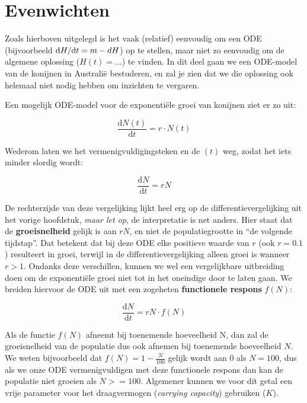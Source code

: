 \documentclass[
  a4paper,
]{scrbook}
\theoremstyle{definition}
\theoremstyle{remark}
\begin{document}
\section{Evenwichten}\label{evenwichten}

Zoals hierboven uitgelegd is het vaak (relatief) eenvoudig om een ODE
(bijvoorbeeld \(\mathchoice{\frac{\mathrm{d}H}
{\mathrm{d}t}}{\mathrm{d}H/\mathrm{d}t}
{\mathrm{d}H/\mathrm{d}t}
{\mathrm{d}H/\mathrm{d}t} = m - dH\)) op te stellen, maar niet zo
eenvoudig om de algemene oplossing (\(H(t) = ...\)) te vinden. In dit
deel gaan we een ODE-model van de konijnen in Australië bestuderen, en
zal je zien dat we die oplossing ook helemaal niet nodig hebben om
inzichten te vergaren.

Een mogelijk ODE-model voor de exponentiële groei van konijnen ziet er
zo uit:

\begin{equation}
    \frac{\mathrm{d}N(t)}{\mathrm{d}t} = r \cdot N(t)
\end{equation}

Wederom laten we het vermenigvuldigingsteken en de \((t)\) weg, zodat
het iets minder slordig wordt:

\begin{equation}
    \frac{\mathrm{d}N}{\mathrm{d}t} = rN
\end{equation}

De rechterzijde van deze vergelijking lijkt heel erg op de
differentievergelijking uit het vorige hoofdstuk, \emph{maar let op}, de
interpretatie is net anders. Hier staat dat de \textbf{groeisnelheid}
gelijk is aan \(rN\), en niet de populatiegrootte in ``de volgende
tijdstap''. Dat betekent dat bij deze ODE elke positieve waarde van
\(r\) (ook \(r=0.1\)) resulteert in groei, terwijl in de
differentievergelijking alleen groei is wanneer \(r>1\). Ondanks deze
verschillen, kunnen we wel een vergelijkbare uitbreiding doen om de
exponentiële groei niet tot in het oneindige door te laten gaan. We
breiden hiervoor de ODE uit met een zogeheten \textbf{functionele
respons} \(f(N)\):

\begin{equation}
    \frac{\mathrm{d}N}{\mathrm{d}t} = rN \cdot f(N)
\end{equation}

Als de functie \(f(N)\) afneemt bij toenemende hoeveelheid N, dan zal de
groeisnelheid van de populatie dus ook afnemen bij toenemende
hoeveelheid \(N\). We weten bijvoorbeeld dat \(f(N)=1-\frac{N}{100}\)
gelijk wordt aan \(0\) als \(N=100\), dus als we onze ODE
vermenigvuldigen met deze functionele respons dan kan de populatie niet
groeien als \(N>=100\). Algemener kunnen we voor dit getal een vrije
parameter voor het draagvermogen (\emph{carrying capacity}) gebruiken
(\(K\)).
\end{document}
